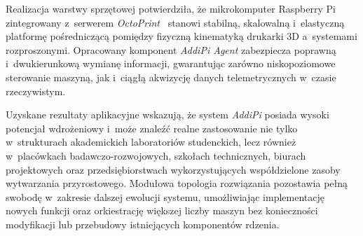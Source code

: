 \documentclass[a4paper,12pt,reqno]{article}
\begin{document}
Realizacja warstwy sprzętowej potwierdziła, że mikrokomputer Raspberry Pi zintegrowany z~serwerem \textit{OctoPrint}~\cite{octoprint} stanowi stabilną, skalowalną i~elastyczną platformę pośredniczącą pomiędzy fizyczną kinematyką drukarki 3D a~systemami rozproszonymi. Opracowany komponent \textit{AddiPi Agent} zabezpiecza poprawną i~dwukierunkową wymianę informacji, gwarantując zarówno niskopoziomowe sterowanie maszyną, jak i~ciągłą akwizycję danych telemetrycznych w~czasie rzeczywistym.

Uzyskane rezultaty aplikacyjne wskazują, że system \textit{AddiPi} posiada wysoki potencjał wdrożeniowy i~może znaleźć realne zastosowanie nie tylko w~strukturach akademickich laboratoriów studenckich, lecz również w~placówkach badawczo-rozwojowych, szkołach technicznych, biurach projektowych oraz przedsiębiorstwach wykorzystujących współdzielone zasoby wytwarzania przyrostowego. Modułowa topologia rozwiązania pozostawia pełną swobodę w~zakresie dalszej ewolucji systemu, umożliwiając implementację nowych funkcji oraz orkiestrację większej liczby maszyn bez konieczności modyfikacji lub przebudowy istniejących komponentów rdzenia.



\newpage



\textsc{}

\newpage
\listoftables
\newpage
\listoffigures
\newpage
\lstlistoflistings
	
	
	






	
	
\end{document}
